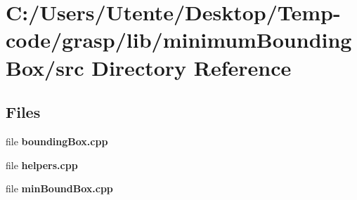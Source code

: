 \section{C\+:/\+Users/\+Utente/\+Desktop/\+Temp-\/code/grasp/lib/minimum\+Bounding\+Box/src Directory Reference}
\label{dir_955816ef8cdaff296bd39f9154bab580}
\subsection*{Files}
\begin{DoxyCompactItemize}
\item 
file {\bfseries bounding\+Box.\+cpp}
\item 
file {\bfseries helpers.\+cpp}
\item 
file {\bfseries min\+Bound\+Box.\+cpp}
\end{DoxyCompactItemize}
